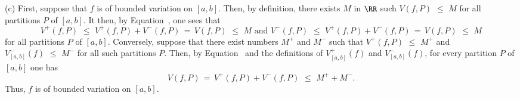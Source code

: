 \V

        (c) First, suppose that $f$ is of bounded variation on $[a,b]$. Then, by definition, there exists $M$ in ${\RR}$ such $V(f,P)\,\,{\leq}\,\,M$ for all partitions $P$ of $[a,b]$.
    It then, by Equation~, one sees that
        \begin{displaymath}
        V^{+}(f,P)\,\,{\leq}\,\,V^{+}(f,P)+V^{-}(f,P) \,=\, V(f,P)\,\,{\leq}\,\,M \mbox{ and }
        V^{-}(f,P)\,\,{\leq}\,\,V^{+}(f,P)+V^{-}(f,P) \,=\, V(f,P)\,\,{\leq}\,\,M
        \end{displaymath}
    for all partitions $P$ of $[a,b]$.
    Conversely, suppose that there exist numbers $M^{+}$ and $M^{-}$ such that $V^{+}(f,P)\,\,{\leq}\,\,M^{+}$ and $V^{-}_{[a,b]}(f)\,\,{\leq}\,\,M^{-}$ for all such partitions $P$.
    Then, by Equation~ and the definitions of $V^{+}_{[a,b]}(f)$ and $V^{-}_{[a,b]}(f)$,
    for every partition $P$ of $[a,b]$ one has
        \begin{displaymath}
        V(f,P) \,=\, V^{+}(f,P)+V^{-}(f,P)\,\,{\leq}\,\,M^{+}+M^{-}.
        \end{displaymath}
    Thus, $f$ is of bounded variation on $[a,b]$. 

